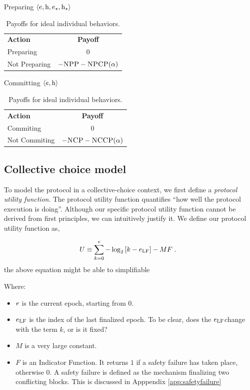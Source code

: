 \documentclass[12pt, final]{article}
\newcommand*{\todo}[1]{\color{red} #1}
\newcommand{\epoch}{\ensuremath{e}\space}
\newcommand{\hash}{\textnormal{h}\space}
\newcommand{\epochsource}{\ensuremath{\epoch_{\star}}\space}
\newcommand{\hashsource}{\ensuremath{\hash_{\star}}\space}
\newcommand{\epochLF}{\ensuremath{\epoch_{\textnormal{LF}}}\space}
\newcommand{\NCP}{\textsc{NCP}\space}
\newcommand{\NCCP}{\textsc{NCCP}\space}
\newcommand{\NPP}{\textsc{NPP}\space}
\newcommand{\NPCP}{\textsc{NPCP}\space}
\begin{document}
\begin{table}[h!bt]
	\centering
   
	Preparing $\langle \epoch, \hash, \epochsource, \hashsource \rangle$  
    { \begin{tabular}{l c}
	\textbf{Action} & \textbf{Payoff} \\
	Preparing & 0 \\
	Not Preparing & $-\NPP - \NPCP(\alpha)$ \\
	\end{tabular}} \hspace{0.5in} Committing $\langle \epoch, \hash \rangle$ 
    { \begin{tabular}{l c} 
	\textbf{Action} & \textbf{Payoff} \\
	Commiting & 0 \\
	Not Commiting & $-\NCP - \NCCP(\alpha)$ \\
	\end{tabular} 
	\label{tbl:commit} }	
	\caption{Payoffs for ideal individual behaviors.}
	\label{fig:individualpayoffs}
\end{table}


\subsection{Collective choice model}
\label{sect:collectivechoice}
To model the protocol in a collective-choice context, we first define a \emph{protocol utility function}. The protocol utility function quantifies ``how well the protocol execution is doing''. Although our specific protocol utility function cannot be derived from first principles, we can intuitively justify it. We define our protocol utility function as,

\begin{equation}
U \equiv \sum_{k = 0}^{\epoch} - \log_2\left[ k - \epochLF \right] - M F \; .
\label{eq:utilityfunction}
\end{equation}
\todo{the above equation might be able to simplifiable}


Where:

\begin{itemize}
\item $\epoch$ is the current epoch, starting from $0$.
\item $\epochLF$ is the index of the last finalized epoch. \todo{To be clear, does the \epochLF change with the term $k$, or is it fixed?}
\item $M$ is a very large constant.
\item $F$ is an Indicator Function.  It returns $1$ if a safety failure has taken place, otherwise 0. A safety failure is defined as the mechanism finalizing two conflicting blocks. This is discussed in Apppendix \ref{app:safetyfailure}
\end{itemize}
\end{document}

